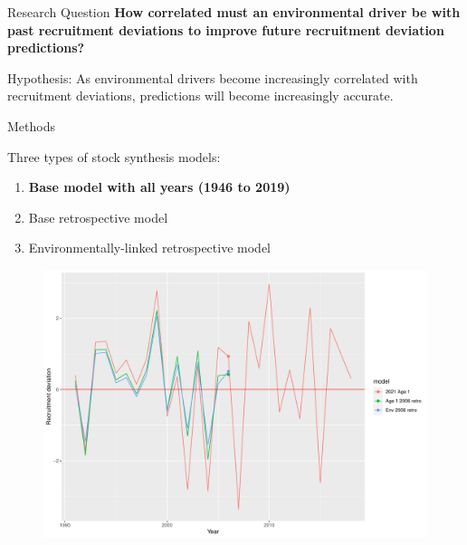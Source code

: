 \documentclass[
  ignorenonframetext,
]{beamer}
\begin{document}
\begin{frame}{Research Question}
\protect\hypertarget{research-question}{}
\textbf{How correlated must an environmental driver be with past
recruitment deviations to improve future recruitment deviation
predictions?}

\pause

Hypothesis: As environmental drivers become increasingly correlated with
recruitment deviations, predictions will become increasingly accurate.
\end{frame}

\begin{frame}{Methods}
\protect\hypertarget{methods}{}
\end{frame}

\begin{frame}
Three types of stock synthesis models:

\begin{enumerate}
\item
  \textbf{Base model with all years (1946 to 2019)}
\item
  Base retrospective model
\item
  Environmentally-linked retrospective model
\end{enumerate}

\begin{figure}

{\centering \includegraphics{presentation_files/figure-beamer/unnamed-chunk-1-1.pdf}

}

\end{figure}
\end{frame}
\end{document}
